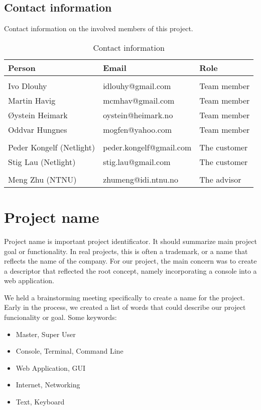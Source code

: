 \subsection{Contact information}
Contact information on the involved members of this project.
\begin{table}
\centering
\caption{Contact information}
\begin{tabular}{ l  l  l  }
 \textbf{Person} & \textbf{Email} & \textbf{Role} \\ 
\hline \\[-2.0ex]
 Ivo Dlouhy & idlouhy@gmail.com & Team member \\
 Martin Havig & mcmhav@gmail.com & Team member \\
 Øystein Heimark & oystein@heimark.no & Team member \\
 Oddvar Hungnes & mogfen@yahoo.com & Team member \\ 
\hline \\[-2.0ex]
 Peder Kongelf (Netlight) & peder.kongelf@gmail.com & The customer \\
 Stig Lau (Netlight) & stig.lau@gmail.com & The customer \\ 
\hline \\[-2.0ex]
  Meng Zhu (NTNU) & zhumeng@idi.ntnu.no & The advisor \\ 
\hline
\end{tabular}
\end{table}

\section{Project name}
Project name is important project identificator. It should summarize main project goal or functionality. In real projects, this is often a trademark, or a name that reflects the name of the company. For our project, the main concern was to create a descriptor that reflected the root concept, namely incorporating a console into a web application.

We held a brainstorming meeting specifically to create a name for the project. Early in the process, we created a list of words that could describe our project funcionality or goal. Some keywords:
\begin{itemize}
\item Master, Super User
\item Console, Terminal, Command Line
\item Web Application, GUI
\item Internet, Networking
\item Text, Keyboard
\end{itemize}

